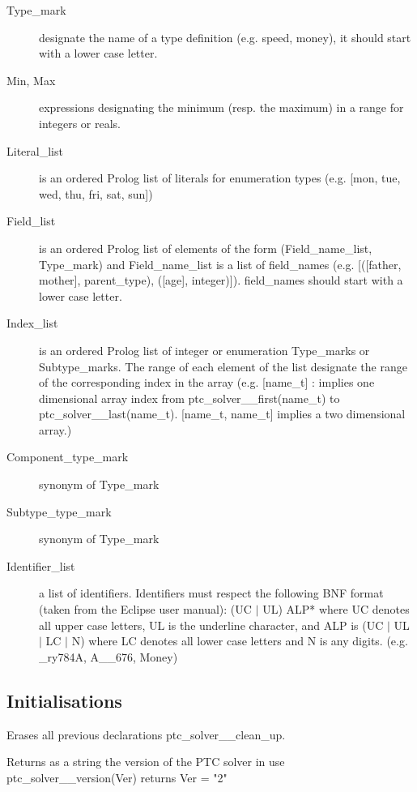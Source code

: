 \documentclass{article}
\begin{document}
\begin{description}
  \item [Type\_mark] designate the name of a type definition (e.g. speed,
  money), it should start with a lower case letter.
  \item [Min, Max] expressions designating the minimum (resp. the maximum) in a
range for integers or reals.
  \item [Literal\_list] is an ordered Prolog list of literals for enumeration
types (e.g. [mon, tue, wed, thu, fri, sat, sun])
  \item [Field\_list] is an ordered Prolog list of elements of the form
(Field\_name\_list, Type\_mark) and Field\_name\_list is a list of field\_names
(e.g. [([father, mother], parent\_type), ([age], integer)]). field\_names
should start with a lower case letter.
  \item [Index\_list] is an ordered Prolog list of integer or enumeration
Type\_marks or Subtype\_marks. The range of each element of the list designate
the range of the corresponding index in the array (e.g. [name\_t] : implies one
dimensional array index from ptc\_solver\_\_first(name\_t) to
ptc\_solver\_\_last(name\_t). [name\_t, name\_t] implies a two dimensional
array.)
  \item [Component\_type\_mark] synonym of Type\_mark
  \item [Subtype\_type\_mark] synonym of Type\_mark
  \item [Identifier\_list] a list of identifiers. Identifiers must respect the
following BNF format (taken from the Eclipse user manual): (UC $\mid$ UL) ALP*
where UC denotes all upper case letters, UL is the underline character, and ALP
is (UC $\mid$ UL $\mid$ LC $\mid$ N) where LC denotes all lower case letters
and N is any digits. (e.g. \_ry784A, A\_\_676, Money)
\end{description}

\subsection{Initialisations}

\hspace{\parindent}
    {Erases all previous declarations}
    {ptc\_solver\_\_clean\_up.}
    {}

    {Returns as a string the version of the PTC solver in use}
    {ptc\_solver\_\_version(Ver) returns Ver = "2"}
    {}
\end{document}
